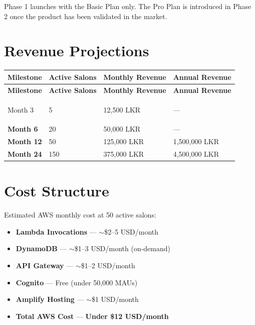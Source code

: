 \documentclass[12pt,a4paper]{report}
\begin{document}
\vspace{0.5cm}

\begin{infobox}
Phase 1 launches with the Basic Plan only. The Pro Plan is introduced in Phase 2
once the product has been validated in the market.
\end{infobox}

\section{Revenue Projections}

\begin{longtable}{>{\bfseries}p{4cm} p{3cm} p{3cm} p{3.5cm}}
  \toprule
  \textbf{Milestone} & \textbf{Active Salons} & \textbf{Monthly Revenue} & \textbf{Annual Revenue} \\
  \midrule
  \endfirsthead
  \toprule
  \textbf{Milestone} & \textbf{Active Salons} & \textbf{Monthly Revenue} & \textbf{Annual Revenue} \\
  \midrule
  \endhead
  \bottomrule
  \endfoot

  Month 3   & 5   & 12,500 LKR    & —              \\[4pt]
  Month 6   & 20  & 50,000 LKR    & —              \\[4pt]
  Month 12  & 50  & 125,000 LKR   & 1,500,000 LKR  \\[4pt]
  Month 24  & 150 & 375,000 LKR   & 4,500,000 LKR  \\
\end{longtable}

\section{Cost Structure}

Estimated AWS monthly cost at 50 active salons:

\begin{itemize}[leftmargin=2em]
  \item \textbf{Lambda Invocations} — $\sim$\$2–5 USD/month
  \item \textbf{DynamoDB} — $\sim$\$1–3 USD/month (on-demand)
  \item \textbf{API Gateway} — $\sim$\$1–2 USD/month
  \item \textbf{Cognito} — Free (under 50,000 MAUs)
  \item \textbf{Amplify Hosting} — $\sim$\$1 USD/month
  \item \textbf{Total AWS Cost} — \textbf{Under \$12 USD/month}
\end{itemize}
\end{document}
